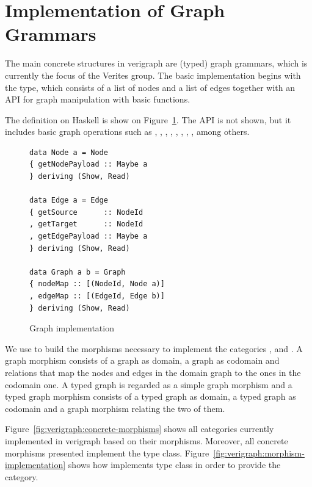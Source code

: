 \section{Implementation of Graph Grammars}

The main concrete structures in verigraph are (typed) graph grammars, which is currently the focus of the Verites group. The basic implementation begins with the  type, which consists of a list of nodes and a list of edges together with an API for graph manipulation with basic functions.

The  definition on Haskell is show on Figure~\ref{fig:verigraph:graph}. The API is not shown, but it includes basic graph operations such as , , , , , , , , among others. 

\begin{figure}[!ht]

\caption{Graph implementation}
\begin{verbatim}
data Node a = Node 
{ getNodePayload :: Maybe a
} deriving (Show, Read)

data Edge a = Edge 
{ getSource      :: NodeId
, getTarget      :: NodeId
, getEdgePayload :: Maybe a
} deriving (Show, Read)

data Graph a b = Graph 
{ nodeMap :: [(NodeId, Node a)]
, edgeMap :: [(EdgeId, Edge b)]
} deriving (Show, Read)
\end{verbatim}
\label{fig:verigraph:graph}
\end{figure}

We use  to build the morphisms necessary to implement the categories ,  and . A graph morphism consists of a graph as domain, a graph as codomain and relations that map the nodes and edges in the domain graph to the ones in the codomain one. A typed graph is regarded as a simple graph morphism and a typed graph morphism consists of a typed graph as domain, a typed graph as codomain and a graph morphism relating the two of them.

Figure~\ref{fig:verigraph:concrete-morphisms} shows all categories currently implemented in verigraph based on their morphisms. Moreover, all concrete morphisms presented implement the  type class. Figure~\ref{fig:verigraph:morphism-implementation} shows how  implements  type class in order to provide the  category.

